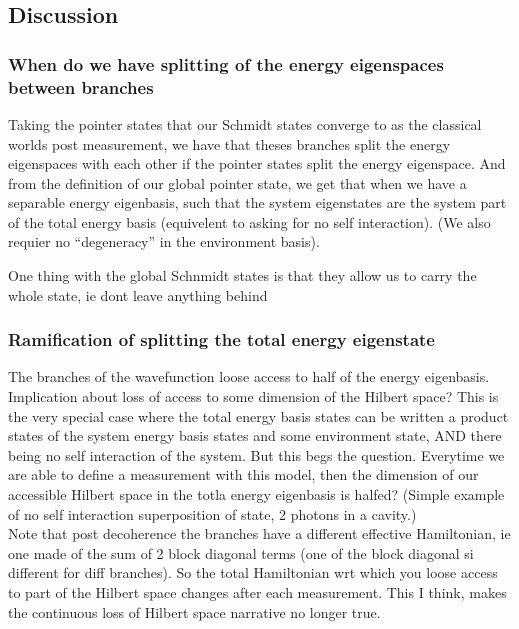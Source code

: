\documentclass{article}
\begin{document}
\begin{comment}
Note that the weight in from of both states are equal if,
    \begin{equation}
        q_1=2(\frac{\sqrt{w}}{\sqrt{1-w}}-1)+q_2\frac{\sqrt{w}}{\sqrt{1-w}}
    \end{equation}
\end{comment}


\subsection{Discussion}

\subsubsection{When do we have splitting of the energy eigenspaces between branches}

Taking the pointer states that our Schmidt states converge to as the classical worlds post measurement, we have that theses branches split the energy eigenspaces with each other if the pointer states split the energy eigenspace. And from the definition of our global pointer state, we get that when we have a separable energy eigenbasis, such that the system eigenstates are the system part of the total energy basis (equivelent to asking for no self interaction). (We also requier no “degeneracy” in the environment basis).


One thing with the global Schnmidt states is that they allow us to carry the whole state, ie dont leave anything behind

\subsubsection{Ramification of splitting the total energy eigenstate}
The branches of the wavefunction loose access to half of the energy eigenbasis. 
Implication about loss of access to some dimension of the Hilbert space? 
This is the very special case where the total energy basis states can be written a product states of the system energy basis states and some environment state, AND there being no self interaction of the system.
But this begs the question. Everytime we are able to define a measurement with this model, then the dimension of our accessible Hilbert space in the totla energy eigenbasis is halfed? (Simple example of no self interaction superposition of state, 2 photons in a cavity.) \\
Note that post decoherence the branches have a different effective Hamiltonian, ie one made of the sum of 2 block diagonal terms (one of the block diagonal si different for diff branches). So the total Hamiltonian wrt which you loose access to part of the Hilbert space changes after each measurement. This I think, makes the continuous loss of Hilbert space narrative no longer true. 
\end{document}
